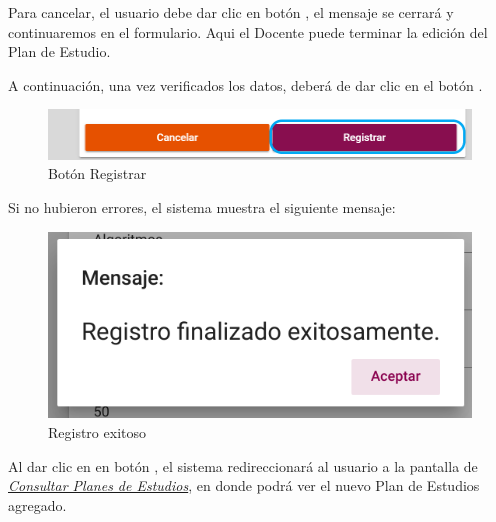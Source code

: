 Para cancelar, el usuario debe dar clic en botón  , el mensaje se cerrará y continuaremos en el formulario. Aqui el Docente puede terminar la edición del Plan de Estudio.

A continuación, una vez verificados los datos, deberá de dar clic en el botón .
\begin{figure}[!hbtp]
	\centering
	\hypertarget{btnreg}{\includegraphics[width=0.7\linewidth]{images/SP4-GPE/registrarB}}
	\caption{Botón Registrar}
	\label{btnreg}
\end{figure}

Si no hubieron errores, el sistema muestra el siguiente mensaje:
	\begin{figure}[!hbtp]
	\centering
	\hypertarget{exito}{\includegraphics[width=0.7\linewidth]{images/SP4-GPE/exito}}
	\caption{Registro exitoso}
	\label{exito}
\end{figure}

Al dar clic en en botón , el sistema redireccionará al usuario a la pantalla de \hyperlink{consultarPE}{\textit{Consultar Planes de Estudios}}, en donde podrá ver el nuevo Plan de Estudios agregado.\\
\newpage
